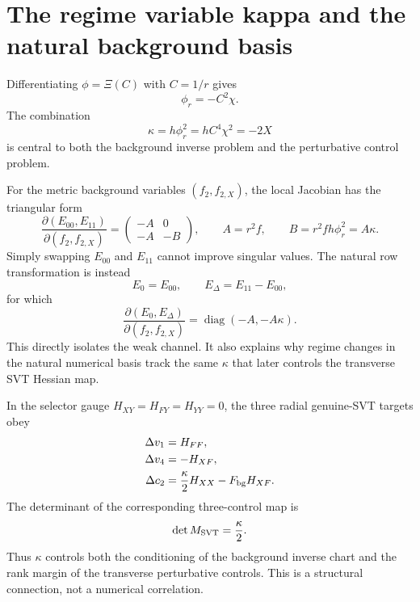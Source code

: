 \documentclass[11pt,a4paper,oneside]{book}
\newcommand{\kap}{\kappa}
\begin{document}
\chapter{The regime variable kappa and the natural background basis}
Differentiating $\phi=\Xi(C)$ with $C=1/r$ gives
\begin{equation}
 \phi_r=-C^2\chi.
\end{equation}
The combination
\begin{equation}
 \boxed{\kap=h\phi_r^2=hC^4\chi^2=-2X}
 \label{eq:kappa}
\end{equation}
is central to both the background inverse problem and the perturbative control problem.

For the metric background variables $(f_2,f_{2,X})$, the local Jacobian has the triangular form
\begin{equation}
 \frac{\partial(E_{00},E_{11})}{\partial(f_2,f_{2,X})}
 =\begin{pmatrix}-A&0\\-A&-B\end{pmatrix},
 \qquad A=r^2f,\qquad B=r^2fh\phi_r^2=A\kap.
\end{equation}
Simply swapping $E_{00}$ and $E_{11}$ cannot improve singular values. The natural row transformation is instead
\begin{equation}
 E_0=E_{00},\qquad E_\Delta=E_{11}-E_{00},
\end{equation}
for which
\begin{equation}
 \frac{\partial(E_0,E_\Delta)}{\partial(f_2,f_{2,X})}
 =\operatorname{diag}(-A,-A\kap).
\end{equation}
This directly isolates the weak channel. It also explains why regime changes in the natural numerical basis track the same $\kap$ that later controls the transverse SVT Hessian map.

In the selector gauge $H_{XY}=H_{FY}=H_{YY}=0$, the three radial genuine-SVT targets obey
\begin{align}
 \Delta v_1&=H_{FF},\\
 \Delta v_4&=-H_{XF},\\
 \Delta c_2&=\frac{\kap}{2}H_{XX}-F_{\rm bg}H_{XF}.
\end{align}
The determinant of the corresponding three-control map is
\begin{equation}
 \det M_{\rm SVT}=\frac{\kap}{2}.
\end{equation}
Thus $\kap$ controls both the conditioning of the background inverse chart and the rank margin of the transverse perturbative controls. This is a structural connection, not a numerical correlation.
\end{document}
